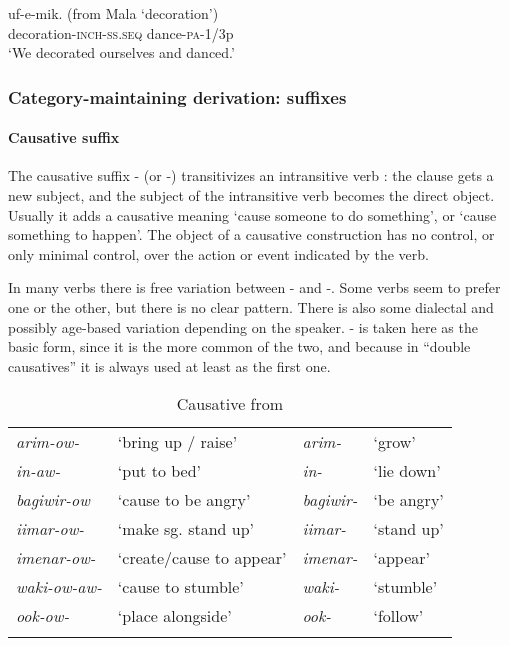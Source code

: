 \ea%
\label{ex:3:x488}
\gll {} uf-e-mik. (from Mala  `decoration') \\
decoration-\textsc{inch}-\textsc{ss}.\textsc{seq} dance-\textsc{pa}-1/3p\\
\glt`We decorated ourselves and danced.'
\z

\subsubsection{Category-maintaining derivation: suffixes}
{}
\paragraph{Causative suffix}\label{sec:3.8.2.3.1}
{}
The causative suffix \nobreakdash- (or \nobreakdash-) transitivizes an intransitive verb \citep[2]{Peterson2007}: the clause gets a new subject, and the subject of the intransitive verb becomes the direct object. Usually it adds a causative meaning `cause someone to do something', or `cause something to happen'. The object of a causative construction has no control, or only minimal control, over the action or event indicated by the verb.

In many verbs there is free variation between \nobreakdash- and \nobreakdash-. Some verbs seem to prefer one or the other, but there is no clear pattern. There is also some dialectal and possibly age-based variation depending on the speaker. \nobreakdash- is taken here as the basic form, since it is the more common of the two, and because in ``double causatives'' it is always used at least as the first one. 

\begin{table}
\caption{Causative from} 
\begin{tabular}{>{\itshape}ll>{\itshape}ll}
\mytoprule
arim-ow- &`bring up / raise' &arim- &`grow'\\
in-aw- &`put to bed' &in- &`lie down'\\
bagiwir-ow &`cause to be angry' &bagiwir- &`be angry'\\
iimar-ow- &`make sg. stand up' &iimar- &`stand up'\\
imenar-ow- &`create/cause to appear' &imenar- &`appear'\\
waki-ow-aw- &`cause to stumble' &waki- &`stumble'\\
ook-ow- &`place alongside' &ook- &`follow'\\
\mybottomrule
\end{tabular}
\end{table}

